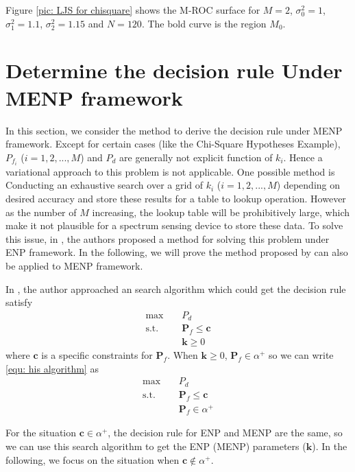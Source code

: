 \documentclass[12pt,journal,a4paper,twoside,onecolumn]{IEEEtran}
\begin{document}
\begin{spacing}{2.5}
Figure \ref{pic: LJS for chisquare} shows the M-ROC surface for $M=2$, $\sigma_0^2 = 1$, $\sigma_1^2 = 1.1$, $\sigma_2^2 = 1.15$ and $N=120$. The bold curve is the region $M_0$. 

\section{Determine the decision rule Under MENP framework}
In this section, we consider the method to derive the decision rule under MENP framework. Except for certain cases (like the Chi-Square Hypotheses Example), $P_{f_i}$ ($i = 1, 2, ..., M$) and $P_d$ are generally not explicit function of $k_i$. Hence a variational approach to this problem is not applicable. One possible method is Conducting an exhaustive search over a grid of $k_i$ ($i = 1, 2, ..., M$) depending on desired accuracy and store these results for a table to lookup operation. However as the number of $M$ increasing, the lookup table will be prohibitively large, which make it not plausible for a spectrum sensing device to store these data. To solve this issue, in \cite{zhang1999desig}, the authors proposed a method for solving this problem under ENP framework. In the following, we will prove the method proposed by \cite{zhang1999desig} can also be applied to MENP framework.

In \cite{zhang1999desig}, the author approached an search algorithm which could get the decision rule satisfy
\begin{equation}
\begin{split}
\label{equ: his algorithm}
\max\;\;\;\;&P_d\\
\text{s.t.}\;\;\;\;&\mathbf{P}_f \leq \mathbf{c}\\
&\mathbf{k} \geq  0
\end{split}
\end{equation}
where $\mathbf{c}$ is a specific constraints for $\mathbf{P}_f$.
When $\mathbf{k} \geq 0$, $\mathbf{P}_f \in \alpha^+$ so we can write \eqref{equ: his algorithm} as 
\begin{equation}
\begin{split}
\label{equ: his algorithm}
\max\;\;\;\;&P_d\\
\text{s.t.}\;\;\;\;&\mathbf{P}_f \leq \mathbf{c}\\
&\mathbf{P}_f \in \alpha^+
\end{split}
\end{equation}

For the situation $\mathbf{c} \in \alpha^+$, the decision rule for ENP and MENP are the same, so we can use this search algorithm to get the ENP (MENP) parameters ($\mathbf{k}$). In the following, we focus on the situation when $\mathbf{c} \notin \alpha^+$. 


\end{spacing}
\end{document}
